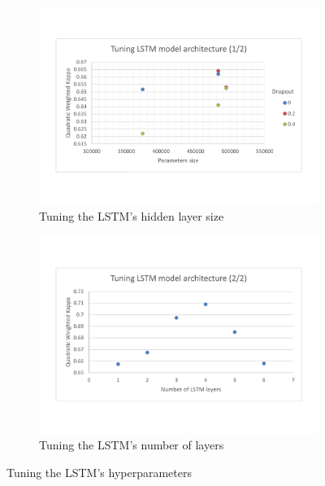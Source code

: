 \documentclass[a4paper,12pt,english]{article}
\begin{document}
\begin{figure}
\vspace*{-1.5cm}
	\begin{subfigure}{0.5\textwidth}
		\includegraphics[width=1.15\linewidth]{fig/tune_lstm_arch_1.pdf}
		\caption{Tuning the LSTM's hidden layer size}
	\end{subfigure}
	\begin{subfigure}{0.5\textwidth}
		\includegraphics[width=1.15\linewidth]{fig/tune_lstm_arch_2.pdf}
		\caption{Tuning the LSTM's number of layers}
	\end{subfigure}
	\caption{Tuning the LSTM's hyperparameters}
	\label{fig:optlstm}
\end{figure}
\end{document}
